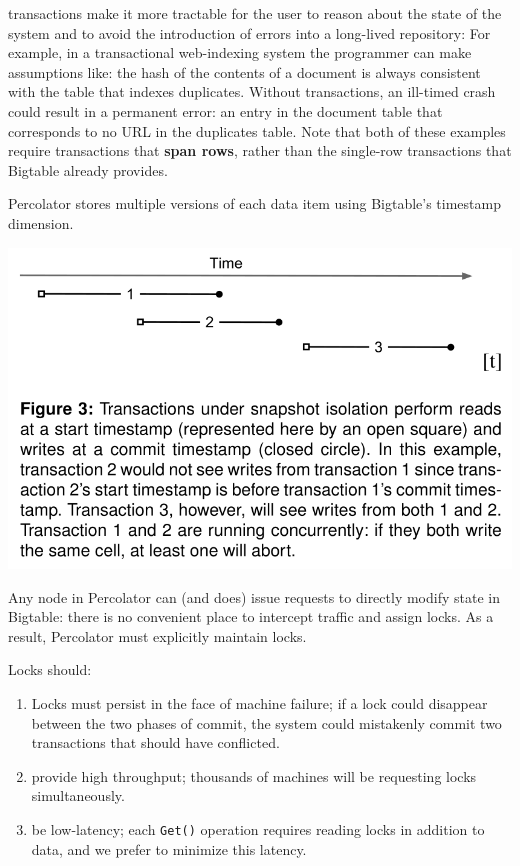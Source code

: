 \documentclass[11pt]{article}
\begin{document}
transactions make it more tractable for the user to reason about the state of the system and to avoid
the introduction of errors into a long-lived repository: For example, in a transactional web-indexing
system the programmer can make assumptions like: the hash of the contents of a document is always
consistent with the table that indexes duplicates. \label{Problem1}
Without transactions, an ill-timed crash could result in a permanent error: an entry in the document
table that corresponds to no URL in the duplicates table.
Note that both of these examples require transactions that \textbf{span rows}, rather than the single-row
transactions that Bigtable already provides.

Percolator stores multiple versions of each data item using Bigtable’s timestamp dimension.
\begin{center}
\includegraphics[width=.8\textwidth]{../../images/papers/4.png}
\label{}
\end{center}

Any node in Percolator can (and does) issue requests to directly modify state in Bigtable: there is no
convenient place to intercept traffic and assign locks. As a result, Percolator must explicitly
maintain locks.

Locks should:
\begin{enumerate}
\item Locks must persist in the face of machine failure; if a lock could disappear between the two phases
of commit, the system could mistakenly commit two transactions that should have conflicted.
\item provide high throughput; thousands of machines will be requesting locks simultaneously.
\item be low-latency; each \texttt{Get()} operation requires reading locks in addition to data, and we prefer to
minimize this latency.
\end{enumerate}
\end{document}

